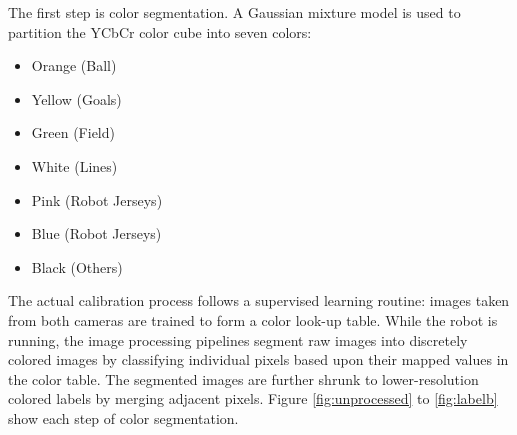 \documentclass{article}
\begin{document}
	The first step is color segmentation. A Gaussian mixture model is used to partition the YCbCr color cube into seven colors:

	\begin{itemize}
		\item Orange (Ball)
		\item Yellow (Goals)
		\item Green (Field)
		\item White (Lines)
		\item Pink (Robot Jerseys)
		\item Blue (Robot Jerseys)
		\item Black (Others)
	\end{itemize}

	The actual calibration process follows a supervised learning routine: images taken from both cameras are trained to form a color look-up table. While the robot is running, the image processing pipelines segment raw images into discretely colored images by classifying individual pixels based upon their mapped values in the color table. The segmented images are further shrunk to lower-resolution colored labels by merging adjacent pixels. Figure \ref{fig:unprocessed} to \ref{fig:labelb} show each step of color segmentation.
\end{document}
